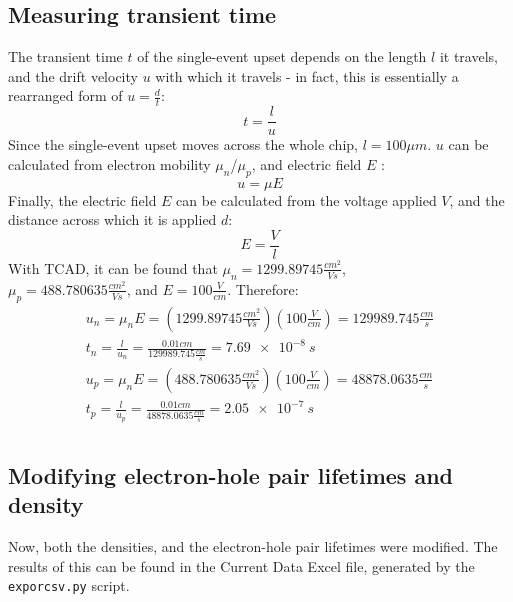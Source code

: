 \documentclass[12pt]{article}
\begin{document}
  \subsection{Measuring transient time}
  The transient time $t$ of the single-event upset depends on the length $l$ it travels, and the drift velocity $u$ with which it travels - in fact, this is essentially a rearranged form of $u=\frac{d}{t}$:
  \begin{equation}
    t=\frac{l}{u}
  \end{equation}
  Since the single-event upset moves across the whole chip, $l=100{\mu}m$. $u$ can be calculated from electron mobility $\mu_n$/$\mu_p$, and electric field $E$ \citep{wikipedia_drift}:
  \begin{equation}
    u={\mu}E
  \end{equation}
  Finally, the electric field $E$ can be calculated from the voltage applied $V$, and the distance across which it is applied $d$:
  \begin{equation}
    E=\frac{V}{l}
  \end{equation}
  With TCAD, it can be found that $\mu_n=1299.89745\frac{cm^2}{Vs}$, \\$\mu_p=488.780635\frac{cm^2}{Vs}$, and $E=100\frac{V}{cm}$. Therefore:
\begin{equation}
  \begin{gathered}
    u_n=\mu_nE=(1299.89745\frac{cm^2}{Vs})(100\frac{V}{cm})=129989.745\frac{cm}{s}\\
    t_n=\frac{l}{u_n}=\frac{0.01cm}{129989.745\frac{cm}{s}}=\SI{7.69e-8}{s}\\
    u_p=\mu_nE=(488.780635\frac{cm^2}{Vs})(100\frac{V}{cm})=48878.0635\frac{cm}{s}\\
    t_p=\frac{l}{u_p}=\frac{0.01cm}{48878.0635\frac{cm}{s}}=\SI{2.05e-7}{s}\\
  \end{gathered}
\end{equation}

\subsection{Modifying electron-hole pair lifetimes and density}
Now, both the densities, and the electron-hole pair lifetimes were modified. The results of this can be found in the Current Data Excel file, generated by the \lstinline{exporcsv.py} script.



\end{document}

